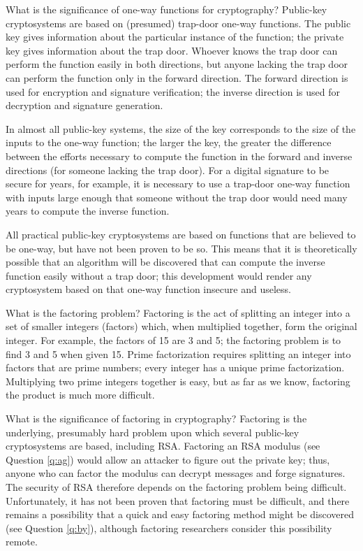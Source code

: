 {What is the significance of one-way functions for cryptography?}
Public-key cryptosystems are based on (presumed) trap-door one-way 
functions. The public key gives information about the particular 
instance of the function; the private key gives information about the trap 
door. Whoever knows the trap door can perform the function easily in both
directions, but anyone lacking the trap door can perform the function only 
in the forward direction. The forward direction is used for encryption and 
signature verification; the inverse direction is used for decryption and 
signature generation.

In almost all public-key systems, the size of the key corresponds to the 
size of the inputs to the one-way function; the larger the key, the greater
the difference between the efforts necessary to compute the function in the 
forward and inverse directions (for someone lacking the trap door). For a 
digital signature to be secure for years, for example, it is necessary to 
use a trap-door one-way function with inputs large enough that someone without 
the trap door would need many years to compute the inverse function.

All practical public-key cryptosystems are based on functions that are 
believed to be one-way, but have not been proven to be so. This means that 
it is theoretically possible that an algorithm will be discovered that can 
compute the inverse function easily without a trap door; this development 
would render any cryptosystem based on that one-way function insecure and 
useless. 

{What is the factoring problem?}
Factoring is the act of splitting an integer into a set of smaller integers
(factors) which, when multiplied together, form the original integer. 
For example, the factors of 15 are 3 and 5; the factoring problem is 
to find 3 and 5 when given 15. Prime factorization requires splitting an 
integer into factors that are prime numbers; every integer has a unique 
prime factorization. Multiplying two prime integers together is easy, but 
as far as we know, factoring the product is much more difficult. 

{What is the significance of factoring in cryptography?}
Factoring is the underlying, presumably hard problem upon which several 
pub\-lic-key cryptosystems are based, including RSA. Factoring an RSA
modulus (see Question \ref{q:ag}) would allow an attacker to figure out 
the private key; thus, anyone who can factor the modulus can decrypt 
messages and forge signatures. The security of RSA therefore depends on 
the factoring problem being difficult. Unfortunately, it has not been 
proven that factoring must be difficult, and there remains a possibility 
that a quick and easy factoring method might be discovered (see Question 
\ref{q:by}), although factoring researchers consider this possibility remote.

